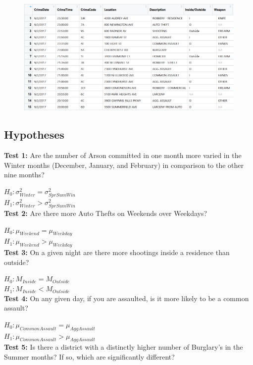 \documentclass{article}
\newlength\tindent
\renewcommand{\indent}{\hspace*{\tindent}}
\begin{document}
\begin{figure}[h]
\centering
\includegraphics[width = 1.0\textwidth]{DataSetView.png}
\end{figure}


\subsection*{Hypotheses}
\indent  \textbf{Test 1:} Are the number of Arson committed in one month more varied in the Winter months (December, January, and February) in comparison to the other nine months?

$H_{0}: \sigma_{Winter}^{2} = \sigma_{SprSumWin}^{2}$ \\
$H_{1}: \sigma_{Winter}^{2} > \sigma_{SprSumWin}^{2}$ \\

\indent \textbf{Test 2:} Are there more Auto Thefts on Weekends over Weekdays?

$H_{0}: \mu_{Weekend} = \mu_{Weekday}$ \\
$H_{1}: \mu_{Weekend} > \mu_{Weekday}$ \\

\indent \textbf{Test 3:} On a given night are there more shootings inside a residence than outside?  

$H_{0}: M_{Inside} = M_{Outside}$ \\
$H_{1}: M_{Inside} < M_{Outside}$ \\

\indent \textbf{Test 4:} On any given day, if you are assaulted, is it more likely to be a common assault?  

$H_{0}: \mu_{CommonAssault} = \mu_{AggAssault}$ \\
$H_{1}: \mu_{CommonAssault} > \mu_{AggAssault}$ \\

\indent \textbf{Test 5:} Is there a district with a distinctly higher number of Burglary's in the Summer months?  If so, which are significantly different?  
\end{document}
